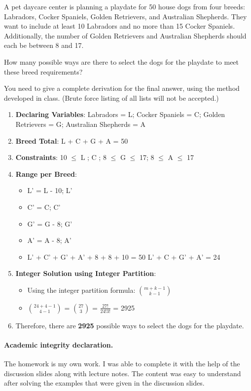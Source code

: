 \documentclass[11pt]{article}
\newcounter{prnum}
\newenvironment{problem}{{\vskip 0.2in\noindent\bf Problem
       \addtocounter{prnum}{1} \arabic{prnum}.}}{\vskip 0.1in}
\begin{document}
\begin{problem}
A pet daycare center is planning a playdate for 50 house dogs from four breeds: Labradors, Cocker Spaniels, Golden Retrievers, and Australian Shepherds. They want to include at least 10 Labradors and no more than 15 Cocker Spaniels. Additionally, the number of Golden Retrievers and Australian Shepherds should each be between 8 and 17.

\noindent How many possible ways are there to select the dogs for the playdate to meet these breed requirements?

\noindent You need to give a complete derivation for the final answer, using the method developed in class. 
(Brute force listing of all lists will not be accepted.)
\begin{enumerate}
  \item \textbf{Declaring Variables}: Labradors = L; Cocker Spaniels = C; Golden Retrievers = G; Australian Shepherds = A
  \item \textbf{Breed Total}: L + C + G + A = 50
  \item \textbf{Constraints}: 10 $\leq$ L ; C  ; 8 $\leq$ G $\leq$ 17; 8 $\leq$ A $\leq$ 17
  \item \textbf{Range per Breed}:
    \begin{itemize}
      \item L' = L - 10; \leq\space L'
      \item C' = C; \leq\space C' \leq{}
      \item G' = G - 8; \leq\space G' \leq{}
      \item A' = A - 8; \leq\space A' \leq{}
      \item L' + C' + G' + A' + 8 + 8 + 10 = 50 \Rightarrow L' + C + G' + A' = 24
    \end{itemize}
  \item \textbf{Integer Solution using Integer Partition}:
    \begin{itemize}
      \item Using the integer partition formula: $m + k - 1 \choose k - 1$
      \item $24 + 4 - 1 \choose 4 - 1$ = $27 \choose 3$ = $\frac{27!}{24!3!}$ = 2925
    \end{itemize}
  \item Therefore, there are \textbf{2925} possible ways to select the dogs for the playdate.

\end{enumerate}
\end{problem}
  


\vskip 0.2in
\paragraph{Academic integrity declaration.}
  The homework is my own work. I was able to complete it with the help of the discussion slides along with lecture notes.
  The content was easy to understand after solving the examples that were given in the discussion slides.
\end{document}
